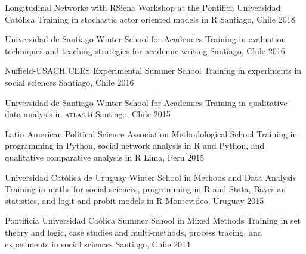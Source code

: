 \vspace{1mm}

\begin{cvhonors}
\cvhonor
{Longitudinal Networks with RSiena Workshop at the Pontifica Universidad Cat\'olica}
{Training in stochastic actor oriented models in R}
{Santiago, Chile}
{2018}
\end{cvhonors}

\vspace{1mm}

\begin{cvhonors}
\cvhonor
{Universidad de Santiago Winter School for Academics}
{Training in evaluation techniques and teaching strategies for academic writing}
{Santiago, Chile}
{2016}
\end{cvhonors}

\vspace{1mm}

\begin{cvhonors}
\cvhonor
{Nuffield-USACH CEES Experimental Summer School}
{Training in experiments in social sciences}
{Santiago, Chile}
{2016}
\end{cvhonors}

\vspace{1mm}

\begin{cvhonors}
\cvhonor
{Universidad de Santiago Winter School for Academics}
{Training in qualitative data analysis in {\scshape atlas}.ti}
{Santiago, Chile}
{2015}
\end{cvhonors}

\vspace{1mm}

\begin{cvhonors}
\cvhonor
{Latin American Political Science Association Methodological School}
{Training in programming in Python, social network analysis in R and Python, and qualitative comparative analysis in R}
{Lima, Peru}
{2015}
\end{cvhonors}

\vspace{1mm}

\begin{cvhonors}
\cvhonor
{Universidad Cat\'olica de Uruguay Winter School in Methods and Data Analysis}
{Training in maths for social sciences, programming in R and Stata, Bayesian statistics, and logit and probit models in R}
{Montevideo, Uruguay}
{2015}
\end{cvhonors}

\vspace{1mm}

\begin{cvhonors}
\cvhonor
{Pontificia Universidad Ca\'olica Summer School in Mixed Methods}
{Training in set theory and logic, case studies and multi-methods, process tracing, and experiments in social sciences}
{Santiago, Chile}
{2014}
\end{cvhonors}

\vspace{1mm}
